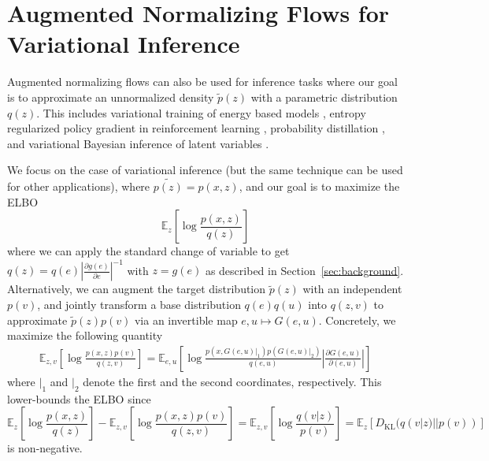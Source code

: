 \documentclass{article}
\newcommand{\E}{\mathbb{E}}
\newcommand{\KL}{D_{\mathrm{KL}}}
\begin{document}
\clearpage

\section{Augmented Normalizing Flows for Variational Inference}
\label{app:anf_vi}
Augmented normalizing flows can also be used for inference tasks where our goal is to approximate an unnormalized density $\tilde{p}(z)$ with a parametric distribution $q(z)$. 
This includes variational training of energy based models \citep{dai2017calibrating, zhai2016generative}, entropy regularized policy gradient in reinforcement learning \citep{mazoure2019leveraging, ward2019improving}, probability distillation \citep{oord2017parallel}, and variational Bayesian inference of latent variables \citep{kingma2013auto}. 

We focus on the case of variational inference (but the same technique can be used for other applications), where $\tilde{p(z)}=p(x,z)$, and our goal is to maximize the ELBO
$$\E_{z}\left[\log\frac{p(x,z)}{q(z)}\right]$$
where we can apply the standard change of variable to get $q(z)=q(e)\left|\frac{\partial g(e)}{\partial e}\right|^{-1}$ with $z=g(e)$ as described in Section~\ref{sec:background}.
Alternatively, we can augment the target distribution $\tilde{p}(z)$ with an independent $p(v)$, and jointly transform a base distribution $q(e)q(u)$ into $q(z,v)$ to approximate $\tilde{p}(z)p(v)$ via an invertible map $e,u\mapsto G(e, u)$.
Concretely, we maximize the following quantity
\begin{align}
\E_{z,v}\left[\log\frac{p(x,z)p(v)}{q(z,v)}\right]
=\E_{e,u}\left[\log\frac{p(x,G(e, u)|_1)p(G(e, u)|_2)}{q(e,u)}\left|\frac{\partial G(e,u)}{\partial (e,u)}\right|\right]
\label{eq:elbo_anf}
\end{align}
where $|_1$ and $|_2$ denote the first and the second coordinates, respectively.
This lower-bounds the ELBO since 
$$\E_{z}\left[\log\frac{p(x,z)}{q(z)}\right] - \E_{z,v}\left[\log\frac{p(x,z)p(v)}{q(z,v)}\right] = \E_{z,v}\left[\log \frac{q(v|z)}{p(v)}\right] = \E_z[\KL(q(v|z)||p(v))]$$
is non-negative. 
\end{document}
